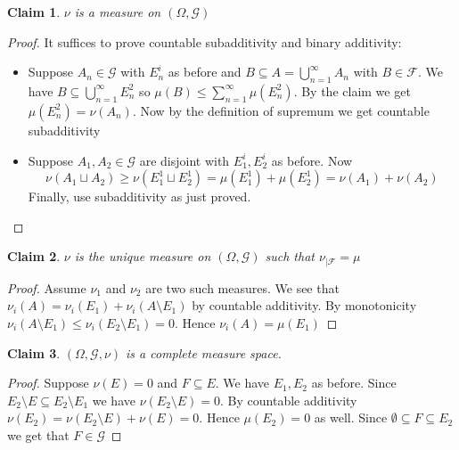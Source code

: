 \documentclass[a4paper,11pt]{article}
\newtheorem{claim}{Claim}
\begin{document}
\begin{claim}
  $\nu$ is a measure on $(\Omega,\mathcal{G})$
\end{claim}

\begin{proof}
  It suffices to prove countable subadditivity and binary additivity:
  \begin{itemize}
    \item Suppose $A_n \in \mathcal{G}$ with $E_n^i$ as before and $B \subseteq A = \bigcup_{n=1}^\infty A_n$ with $B \in \mathcal{F}$. We have
          $B \subseteq \bigcup_{n=1}^\infty E_n^2$ so $\mu(B) \leq \sum_{n=1}^\infty \mu( E_n^2)$.
          By the claim we get $\mu(E_n^2) = \nu(A_n)$.
          Now by the definition of supremum we get countable subadditivity
    \item Suppose $A_1,A_2 \in \mathcal{G}$ are disjoint with $E_1^i,E_2^i$ as before. 
          Now \[\nu(A_1 \sqcup A_2) \geq \nu (E_1^1 \sqcup E_2^1) = \mu(E_1^1) + \mu(E_2^1)=\nu(A_1)+\nu(A_2)\]
          Finally, use subadditivity as just proved.
  \end{itemize}
\end{proof}

\begin{claim}
   $\nu$ is the unique measure on $(\Omega,\mathcal{G})$ such that $\nu_{|\mathcal{F}}=\mu$
\end{claim}

\begin{proof}
    Assume $\nu_1$ and $\nu_2$ are two such measures. We see that $\nu_i(A)=\nu_i(E_1)+\nu_i(A \setminus E_1)$ by countable additivity. 
    By monotonicity $\nu_i(A \setminus E_1)\leq \nu_i(E_2 \setminus E_1)=0$. Hence $\nu_i(A)=\mu(E_1)$
\end{proof}

\begin{claim}
  $(\Omega,\mathcal{G},\nu)$ is a complete measure space.
\end{claim}

\begin{proof}
  Suppose $\nu(E)=0$ and $F \subseteq E$. We have $E_1, E_2$ as before. Since $E_2 \setminus E \subseteq E_2 \setminus E_1$ we have $\nu(E_2 \setminus E)=0$. By countable additivity $\nu(E_2)=\nu(E_2 \setminus E)+\nu(E)=0$. Hence $\mu(E_2)=0$ as well. Since $\emptyset \subseteq F \subseteq E_2$ we get that $F \in \mathcal{G}$
\end{proof}
\end{document}
